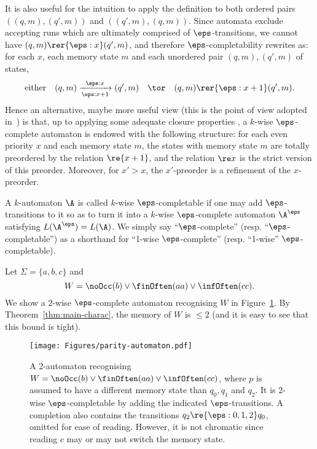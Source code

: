 It is also useful for the intuition to apply the definition to both ordered pairs $((q,m),(q',m))$ and $((q',m),(q,m))$.
Since automata exclude accepting runs which are ultimately comprised of $\eps$-transitions, we cannot have $(q,m) \rer{\eps:x} (q',m)$, and therefore $\eps$-completability rewrites as: for each $x$, each memory state $m$ and each unordered pair $(q,m),(q',m)$ of states,
\[
    \text{either} \quad (q,m) \xrightarrow[\eps :x+1]{\eps:x} (q',m) \quad \tor \quad (q,m) \rer{\eps:x+1} (q',m). 
\]
Hence an alternative, maybe more useful view (this is the point of view adopted in~\cite{CO24Positional}) is that, up to applying some adequate closure properties%
, a $k$-wise $\eps$-complete automaton is endowed with the following structure: for each even priority $x$ and each memory state $m$, the states with memory state $m$ are totally preordered by the relation $\re {x+1}$, and the relation $\re x$ is the strict version of this preorder.
Moreover, for $x'>x$, the $x'$-preorder is a refinement of the $x$-preorder.

A $k$-automaton $\A$ is called $k$-wise $\eps$-completable if one may add $\eps$-transitions to it so as to turn it into a $k$-wise $\eps$-complete automaton $\A^\eps$ satisfying $L(\A^\eps)=L(\A)$.
We simply say ``$\eps$-complete'' (resp. ``$\eps$-completable'') as a shorthand for ``1-wise $\eps$-complete'' (resp. ``1-wise'' $\eps$-completable).

\begin{example}
    Let $\Sigma = \{a, b,c\}$ and 
    \[W = \noOcc(b) \vee \finOften(aa) \vee \infOften(cc).\]
    We show a $2$-wise $\eps$-complete automaton recognising $W$ in Figure~\ref{fig:aut-eps-complete}. By Theorem~\ref{thm:main-charac}, the memory of $W$ is $\leq 2$ (and it is easy to see that this bound is tight).

    \begin{figure}[h]
        \centering
        \texttt{[image: Figures/parity-automaton.pdf]}
        \caption{A 2-automaton recognising $W=\noOcc(b) \vee \finOften(aa) \vee \infOften(cc)$, where $p$ is assumed to have a different memory state than $q_0,q_1$ and $q_2$. It is $2$-wise $\eps$-completable by adding the indicated $\eps$-transitions. A completion also contains the transitions $q_2\re{\eps:0,1,2} q_0$, omitted for ease of reading. However, it is not chromatic since reading $c$ may or may not switch the memory state.}
        \label{fig:aut-eps-complete}
    \end{figure}
\end{example}


